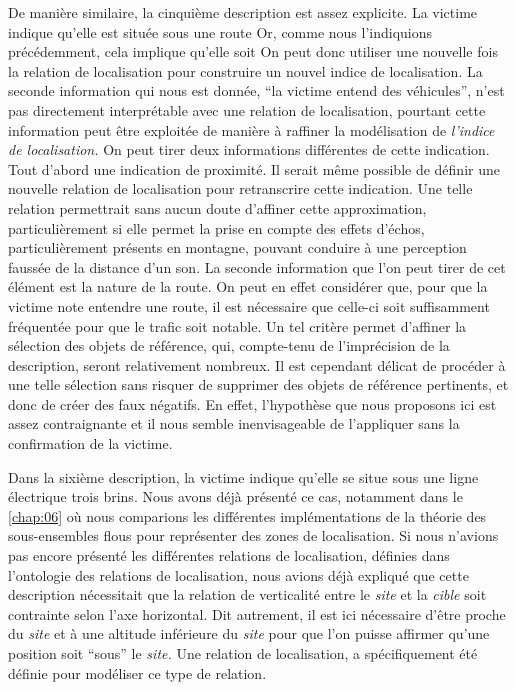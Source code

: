 De manière similaire, la cinquième description est assez explicite. La
victime indique qu'elle est située sous une route
%
Or, comme nous l’indiquions précédemment, cela implique qu'elle soit
%
On peut donc utiliser une nouvelle fois la relation de localisation
 pour construire un nouvel indice de
localisation.
%
La seconde information qui nous est donnée, \enquote{la victime entend
  des véhicules}, n'est pas directement interprétable avec une
relation de localisation, pourtant cette information peut être
exploitée de manière à raffiner la modélisation de \emph{l'indice de
  localisation.}
%
On peut tirer deux informations différentes de cette indication. Tout
d'abord une indication de proximité.
%
Il serait même possible de définir une nouvelle relation de
localisation  pour retranscrire cette
indication.
%
Une telle relation permettrait sans aucun doute d'affiner cette
approximation, particulièrement si elle permet la prise en compte des
effets d’échos, particulièrement présents en montagne, pouvant
conduire à une perception faussée de la distance d'un son.
%
La seconde information que l'on peut tirer de cet élément est la
nature de la route. On peut en effet considérer que, pour que la
victime note entendre une route, il est nécessaire que celle-ci soit
suffisamment fréquentée pour que le trafic soit notable. Un tel
critère permet d'affiner la sélection des objets de référence, qui,
compte-tenu de l’imprécision de la description, seront relativement
nombreux. Il est cependant délicat de procéder à une telle sélection
sans risquer de supprimer des objets de référence pertinents, et donc
de créer des faux négatifs. En effet, l'hypothèse que nous proposons
ici est assez contraignante et il nous semble inenvisageable de
l'appliquer sans la confirmation de la victime.


Dans la sixième description, la victime indique qu'elle se situe sous
une ligne électrique trois brins. Nous avons déjà présenté ce cas,
notamment dans le \autoref{chap:06} où nous comparions les différentes
implémentations de la théorie des sous-ensembles flous pour
représenter des zones de localisation. Si nous n'avions pas encore
présenté les différentes relations de localisation, définies dans
l'ontologie des relations de localisation, nous avions déjà expliqué
que cette description nécessitait que la relation de verticalité entre
le \emph{site} et la \emph{cible} soit contrainte selon l'axe
horizontal. Dit autrement, il est ici nécessaire d'être proche du
\emph{site} et à une altitude inférieure du \emph{site} pour que l'on
puisse affirmer qu'une position soit \enquote{sous} le \emph{site.}
Une relation de localisation,  a spécifiquement
été définie pour modéliser ce type de relation.

